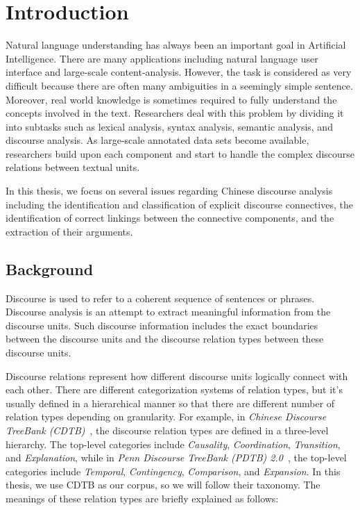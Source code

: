 %
%
%
\chapter{Introduction}
\label{c:intro}

Natural language understanding has always been an important goal in Artificial
Intelligence. There are many applications including natural language user
interface and large-scale content-analysis. However, the task is considered
as very difficult because there are often many ambiguities in a seemingly
simple sentence. Moreover, real world knowledge is sometimes required to fully
understand the concepts involved in the text. Researchers deal with this problem
by dividing it into subtasks such as lexical analysis, syntax analysis, semantic
analysis, and discourse analysis. As large-scale annotated data sets become
available, researchers build upon each component and start to handle the
complex discourse relations between textual units.

In this thesis, we focus on several issues regarding Chinese discourse analysis
including the identification and classification of explicit discourse connectives,
the identification of correct linkings between the connective components,
and the extraction of their arguments. 

%
%
\section{Background}

Discourse is used to refer to a coherent sequence of sentences or phrases.
Discourse analysis is an attempt to extract meaningful information from
the discourse units. Such discourse information includes the exact boundaries
between the discourse units and the discourse relation types between
these discourse units.

Discourse relations represent how different discourse units logically connect
with each other.  There are different categorization systems of relation types, but
it's usually defined in a hierarchical manner so that there are different number
of relation types depending on granularity. For example, in
\textit{Chinese Discourse TreeBank (CDTB)}~\citep{li2014building}, the discourse
relation types are defined in a three-level hierarchy. The top-level categories
include \textit{Causality}, \textit{Coordination}, \textit{Transition},
and \textit{Explanation},
while in \textit{Penn Discourse TreeBank (PDTB) 2.0}~\citep{Prasad08thepenn},
the top-level categories include \textit{Temporal}, \textit{Contingency},
\textit{Comparison}, and \textit{Expansion}. In this thesis, we use
CDTB as our corpus, so we will follow their taxonomy. The meanings of these
relation types are briefly explained as follows:

